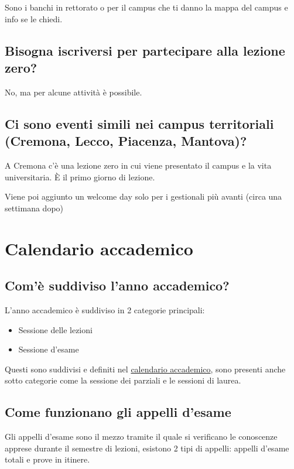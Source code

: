 \documentclass[legal]{polinetwork}
\begin{document}
Sono i banchi in rettorato o per il campus che ti danno la mappa del campus e info se le chiedi.

\subsection{Bisogna iscriversi per partecipare alla lezione zero?}


No, ma per alcune attività è possibile.

\subsection{Ci sono eventi simili nei campus territoriali (Cremona, Lecco, Piacenza, Mantova)?}


A Cremona c’è una lezione zero in cui viene presentato il campus e la vita universitaria. È il primo giorno di lezione.

Viene poi aggiunto un welcome day solo per i gestionali più avanti (circa una settimana dopo)

\section{Calendario accademico}


\subsection{Com'è suddiviso l'anno accademico?}


L'anno accademico è suddiviso in 2 categorie principali:

\begin{itemize}
  \item Sessione delle lezioni
  \item Sessione d'esame
\end{itemize}


Questi sono suddivisi e definiti nel \href{https://www.polimi.it/studenti/calendari-e-scadenze}{calendario accademico}, sono presenti anche sotto categorie come la sessione dei parziali e le sessioni di laurea.

\subsection{Come funzionano gli appelli d'esame}


Gli appelli d'esame sono il mezzo tramite il quale si verificano le conoscenze apprese durante il semestre di lezioni, esistono 2 tipi di appelli: appelli d'esame totali e prove in itinere.
\end{document}
